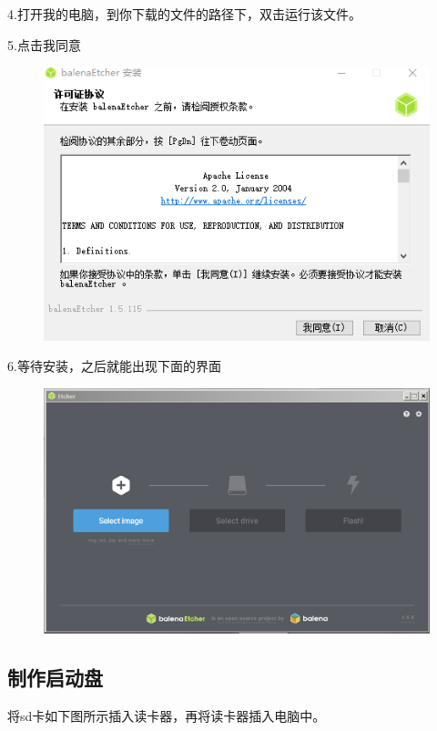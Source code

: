 \documentclass[openbib]{article}
\begin{document}
4.打开我的电脑，到你下载的文件的路径下，双击运行该文件。

5.点击我同意
\begin{figure}[H]
	\centering
	\includegraphics[scale=0.35]{b2}
\end{figure}

6.等待安装，之后就能出现下面的界面

\begin{figure}[H]
	\centering
	\includegraphics[scale=0.4]{Etcher}
\end{figure}

\subsection{制作启动盘}
将sd卡如下图所示插入读卡器，再将读卡器插入电脑中。
\end{document}
